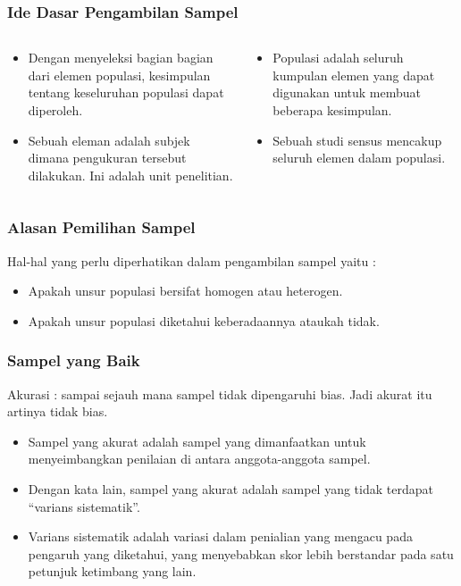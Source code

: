 \documentclass[main.tex]{subfiles}
\begin{document}
\begin{frame}[c]
	\frametitle{Ide Dasar Pengambilan Sampel}
	\begin{columns}
		\begin{column}{0.5\textwidth}
			\begin{itemize}
				\item Dengan menyeleksi bagian bagian dari elemen populasi, kesimpulan tentang keseluruhan populasi  dapat diperoleh.
				\item Sebuah eleman adalah subjek dimana pengukuran tersebut dilakukan. Ini adalah unit penelitian.
			\end{itemize}
		\end{column}
		\begin{column}{0.5\textwidth}
			\begin{itemize}
				\item Populasi adalah seluruh kumpulan elemen yang dapat digunakan untuk membuat beberapa kesimpulan.
				\item Sebuah studi sensus mencakup seluruh elemen  dalam populasi.
			\end{itemize}
		\end{column}
	\end{columns}
\end{frame}

\begin{frame}[c]
	\frametitle{Alasan Pemilihan Sampel}
	Hal-hal yang perlu diperhatikan dalam pengambilan sampel  yaitu :

	\begin{itemize}
		\item Apakah unsur populasi bersifat homogen atau heterogen.
		\item Apakah unsur populasi diketahui keberadaannya ataukah tidak.
	\end{itemize}
\end{frame}

\begin{frame}[c]
	\frametitle{Sampel yang Baik}
	Akurasi : sampai sejauh mana sampel tidak dipengaruhi bias. Jadi akurat itu artinya tidak bias.
	\begin{itemize}
		\item Sampel yang akurat adalah sampel yang dimanfaatkan untuk menyeimbangkan penilaian di antara anggota-anggota sampel.
		\item Dengan kata lain, sampel yang akurat adalah sampel yang tidak terdapat “varians sistematik”.
		\item Varians sistematik adalah variasi dalam penialian yang mengacu pada pengaruh yang diketahui, yang menyebabkan skor lebih berstandar pada satu petunjuk ketimbang yang lain.
	\end{itemize}
\end{frame}
\end{document}
